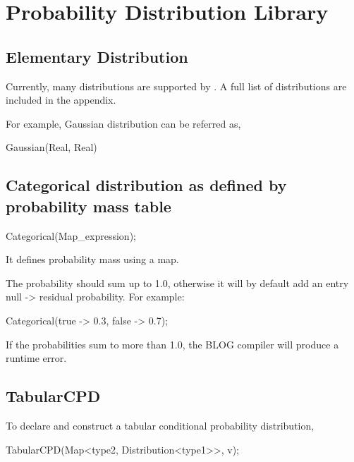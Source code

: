 \documentclass[12pt]{article}
\begin{document}
\section{Probability Distribution Library}
\label{sec:distribution}

\subsection{Elementary Distribution}
Currently, many distributions are supported by \bl. A full list of distributions are included in the appendix. 

For example, Gaussian distribution can be referred as,
\begin{blogcode}
Gaussian(Real, Real)
\end{blogcode}

\subsection{Categorical distribution as defined by probability mass table}
\begin{blogcode}
Categorical(Map_expression);
\end{blogcode}
It defines probability mass using a map.

The probability should sum up to 1.0, otherwise it will by default add an entry null -> residual probability.
For example:
\begin{blogcode}
Categorical({true -> 0.3, false -> 0.7});
\end{blogcode}

If the probabilities sum to more than 1.0, the BLOG compiler will produce a runtime error.


\subsection{TabularCPD}
To declare and construct a tabular conditional probability distribution, 
\begin{blogcode}
  TabularCPD(Map<type2, Distribution<type1>>, v);
\end{blogcode}
\end{document}
